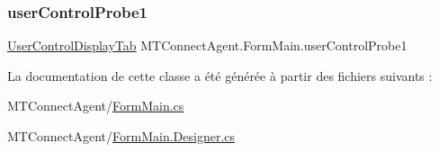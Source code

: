 \mbox{\label{class_m_t_connect_agent_1_1_form_main_adec9b69cbb5d4fa32dac340367ca98fa}} 
\subsubsection{\texorpdfstring{user\+Control\+Probe1}{userControlProbe1}}
{\footnotesize\ttfamily \mbox{\hyperlink{class_m_t_connect_agent_1_1_user_control_display_tab}{User\+Control\+Display\+Tab}} M\+T\+Connect\+Agent.\+Form\+Main.\+user\+Control\+Probe1\hspace{0.3cm}{\ttfamily [private]}}



La documentation de cette classe a été générée à partir des fichiers suivants \+:\begin{DoxyCompactItemize}
\item 
M\+T\+Connect\+Agent/\mbox{\hyperlink{_form_main_8cs}{Form\+Main.\+cs}}\item 
M\+T\+Connect\+Agent/\mbox{\hyperlink{_form_main_8_designer_8cs}{Form\+Main.\+Designer.\+cs}}\end{DoxyCompactItemize}
